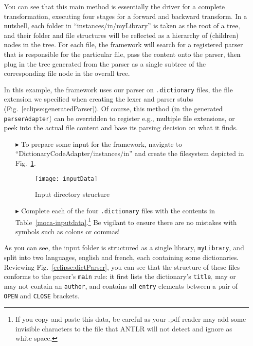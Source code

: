 \newpage

You can see that this main method is essentially the driver for a complete transformation, executing four stages for a forward and backward transform. In a
nutshell, each folder in ``instances/in/myLibrary'' is taken as the root of a tree, and their folder and file structures will be reflected as a hierarchy of
(children) nodes in the tree. For each file, the framework will search for a registered parser that is responsible for the particular file, pass the content
onto the parser, then plug in the tree generated from the parser as a single subtree of the corresponding file node in the overall tree.

In this example, the framework uses our parser on \texttt{.dictionary} files, the file extension we specified when creating the lexer and parser stubs
(Fig.~\ref{eclipse:generatedParser}). Of course, this method (in the generated \texttt{parserAdapter}) can be overridden to register e.g., multiple
file extensions, or peek into the actual file content and base its parsing decision on what it finds.

\begin{itemize}

\item[$\blacktriangleright$] To prepare some input for the framework, navigate to ``DictionaryCodeAdapter/instances/in'' and create the
filesystem depicted in Fig.~\ref{eclipse:textDirectory}. 

\begin{figure}[htp]
\begin{center}
  \texttt{[image: inputData]}
  \caption{Input directory structure}
  \label{eclipse:textDirectory}
\end{center}
\end{figure}

\item[$\blacktriangleright$] Complete each of the four \texttt{.dictionary} files with the contents in Table~\ref{moca-inputdata}.\footnote{If you copy and
paste this data, be careful as your .pdf reader may add some invisible characters to the file that ANTLR will not detect and ignore as white space.} 
Be vigilant to ensure there are no mistakes with symbols such as colons or commas!

\end{itemize}

As you can see, the input folder is structured as a single library, \texttt{myLibrary}, and split into two languages, english and french, each containing
some dictionaries. Reviewing Fig.~\ref{eclipse:dictParser}, you can see that the structure of these files conforms to the parser's \texttt{main} rule: it
first lists the dictionary's \texttt{title}, may or may not contain an \texttt{author}, and contains all \texttt{entry} elements between a pair of \texttt{OPEN}
and \texttt{CLOSE} brackets.

